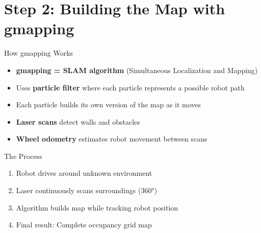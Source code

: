 \documentclass[10pt]{beamer}
\begin{document}
\section{Step 2: Building the Map with gmapping}

\begin{frame}{How gmapping Works}
\begin{itemize}
    \item \textbf{gmapping = SLAM algorithm} (Simultaneous Localization and Mapping)
    \item Uses \textbf{particle filter} where each particle represents a possible robot path
    \item Each particle builds its own version of the map as it moves
    \item \textbf{Laser scans} detect walls and obstacles
    \item \textbf{Wheel odometry} estimates robot movement between scans
\end{itemize}

\vspace{3mm}
\begin{block}{The Process}
\begin{enumerate}
    \item Robot drives around unknown environment
    \item Laser continuously scans surroundings (360°)
    \item Algorithm builds map while tracking robot position
    \item Final result: Complete occupancy grid map
\end{enumerate}
\end{block}
\end{frame}
\end{document}
